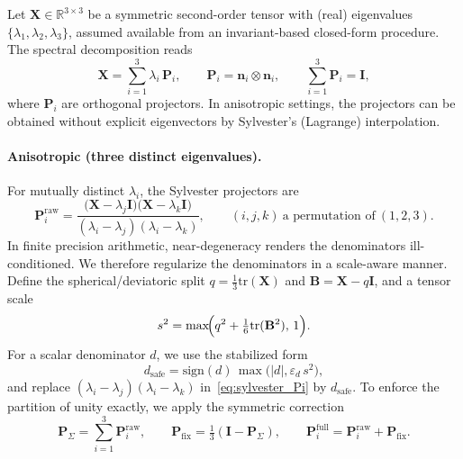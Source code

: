 Let $\mathbf{X}\in\mathbb{R}^{3\times 3}$ be a symmetric second-order tensor with (real) eigenvalues
$\{\lambda_1,\lambda_2,\lambda_3\}$, assumed available from an invariant-based closed-form procedure.
The spectral decomposition reads
\begin{equation}
\mathbf{X}=\sum_{i=1}^{3}\lambda_i\,\mathbf{P}_i,\qquad 
\mathbf{P}_i=\mathbf{n}_i\otimes \mathbf{n}_i,\qquad
\sum_{i=1}^{3}\mathbf{P}_i=\mathbf{I},
\end{equation}
where $\mathbf{P}_i$ are orthogonal projectors.
In anisotropic settings, the projectors can be obtained
without explicit eigenvectors by Sylvester's (Lagrange) interpolation.
\paragraph{Anisotropic (three distinct eigenvalues).}
For mutually distinct $\lambda_i$, the Sylvester projectors are
\begin{equation}
\label{eq:sylvester_Pi}
\mathbf{P}_i^{\mathrm{raw}}
=
\frac{\bigl(\mathbf{X}-\lambda_j\mathbf{I}\bigr)\bigl(\mathbf{X}-\lambda_k\mathbf{I}\bigr)}
{(\lambda_i-\lambda_j)(\lambda_i-\lambda_k)},
\qquad
(i,j,k)\ \text{a permutation of}\ (1,2,3).
\end{equation}
In finite precision arithmetic, near-degeneracy renders the denominators ill-conditioned. We therefore
regularize the denominators in a scale-aware manner.
Define the spherical/deviatoric split
$q=\tfrac13\mathrm{tr}(\mathbf{X})$ and $\mathbf{B}=\mathbf{X}-q\mathbf{I}$, and a tensor scale
\begin{equation}
\label{eq:scale_def}
s^2=\max\!\Bigl(q^2+\tfrac16\mathrm{tr}(\mathbf{B}^2),\,1\Bigr).
\end{equation}
For a scalar denominator $d$, we use the stabilized form
\begin{equation}
\label{eq:denom_stab}
d_{\mathrm{safe}}=\mathrm{sign}(d)\,\max\!\bigl(|d|,\varepsilon_d\,s^2\bigr),
\end{equation}
and replace $(\lambda_i-\lambda_j)(\lambda_i-\lambda_k)$ in~\eqref{eq:sylvester_Pi} by $d_{\mathrm{safe}}$.
To enforce the partition of unity exactly, we apply the symmetric correction
\begin{equation}
\label{eq:unity_fix}
\mathbf{P}_{\Sigma}=\sum_{i=1}^{3}\mathbf{P}_i^{\mathrm{raw}},\qquad
\mathbf{P}_{\mathrm{fix}}=\tfrac13(\mathbf{I}-\mathbf{P}_{\Sigma}),\qquad
\mathbf{P}_i^{\mathrm{full}}=\mathbf{P}_i^{\mathrm{raw}}+\mathbf{P}_{\mathrm{fix}}.
\end{equation}

